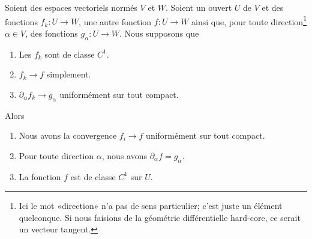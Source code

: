 \begin{theorem}	\label{ThoSerUnifDerr}
	Soient des espaces vectoriels normés \( V\) et \( W\). Soient un ouvert \( U\) de \( V\) et des fonctions \( f_k\colon U\to W\), une autre fonction \( f\colon U\to W\) ainsi que, pour toute direction\footnote{Ici le mot «direction» n'a pas de sens particulier; c'est juste un élément quelconque. Si nous faisions de la géométrie différentielle hard-core, ce serait un vecteur tangent.} \( \alpha\in V\), des fonctions \( g_{\alpha}\colon U\to W\). Nous supposons que
	\begin{enumerate}
		\item
		      Les \( f_k\) sont de classe \( C^1\).
		\item
		      \( f_k\to f\) simplement.
		\item
		      \( \partial_{\alpha}f_k\to g_{\alpha}\) uniformément sur tout compact.
	\end{enumerate}
	Alors
	\begin{enumerate}
		\item       \label{ITEMooQOSUooQGSUXC}
		      Nous avons la convergence \( f_i\to f\) uniformément sur tout compact.
		\item        \label{ITEMooGFPLooGYEvkh}
		      Pour toute direction \( \alpha\), nous avons \( \partial_{\alpha}f=g_{\alpha}\).
		\item
		      La fonction \( f\) est de classe \( C^1\) sur \( U\).
	\end{enumerate}
\end{theorem}

